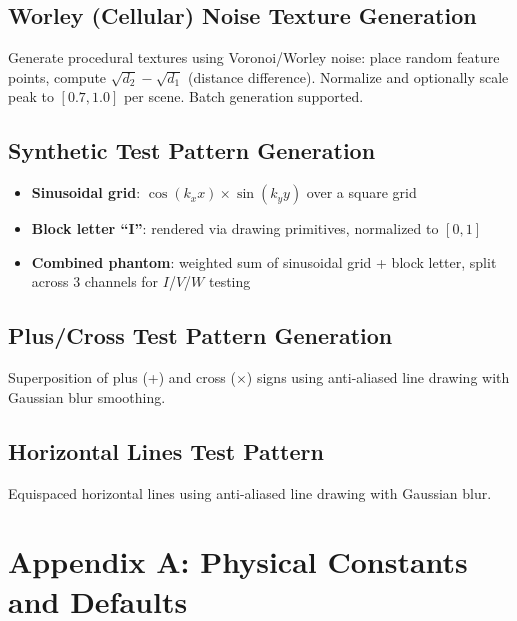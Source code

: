 \documentclass[11pt,a4paper]{article}
\begin{document}
\subsection{Worley (Cellular) Noise Texture Generation}
Generate procedural textures using Voronoi/Worley noise: place random feature points, compute $\sqrt{d_2} - \sqrt{d_1}$ (distance difference). Normalize and optionally scale peak to $[0.7, 1.0]$ per scene. Batch generation supported.

\subsection{Synthetic Test Pattern Generation}
\begin{itemize}[nosep]
  \item \textbf{Sinusoidal grid}: $\cos(k_x x) \times \sin(k_y y)$ over a square grid
  \item \textbf{Block letter ``I''}: rendered via drawing primitives, normalized to $[0,1]$
  \item \textbf{Combined phantom}: weighted sum of sinusoidal grid + block letter, split across 3 channels for $I$/$V$/$W$ testing
\end{itemize}

\subsection{Plus/Cross Test Pattern Generation}
Superposition of plus (+) and cross ($\times$) signs using anti-aliased line drawing with Gaussian blur smoothing.

\subsection{Horizontal Lines Test Pattern}
Equispaced horizontal lines using anti-aliased line drawing with Gaussian blur.

\section{Appendix A: Physical Constants and Defaults}
\end{document}
